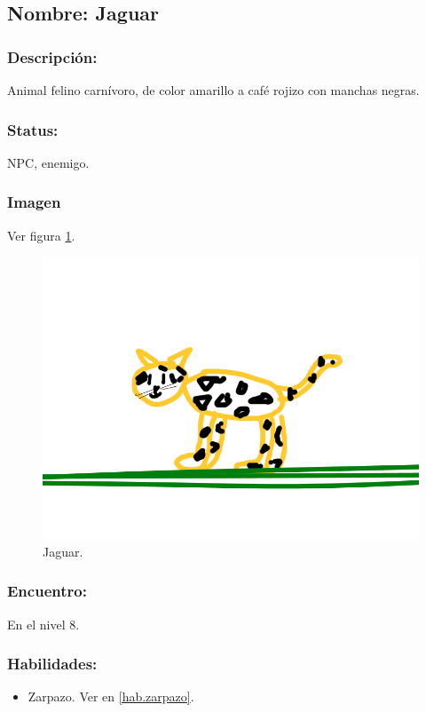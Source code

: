 \documentclass[11pt,letterpaper]{article}
\begin{document}
\subsection{Nombre: Jaguar}   \label{per.jaguar}
\subsubsection{Descripción:}
Animal felino carnívoro, de color amarillo a café rojizo con manchas negras.
\subsubsection{Status:}
NPC, enemigo.
\subsubsection{Imagen}
Ver figura \ref{fig:jaguar}.
\begin{figure}
	\centering
	\includegraphics[height=0.2 \textheight]{Imagenes/jaguar}
	\caption{Jaguar.}
	\label{fig:jaguar}
\end{figure}
\subsubsection{Encuentro:}
En el nivel 8.
\subsubsection{Habilidades:}
\begin{itemize}
	\item Zarpazo. Ver en \ref{hab.zarpazo}.
\end{itemize}
\end{document}
